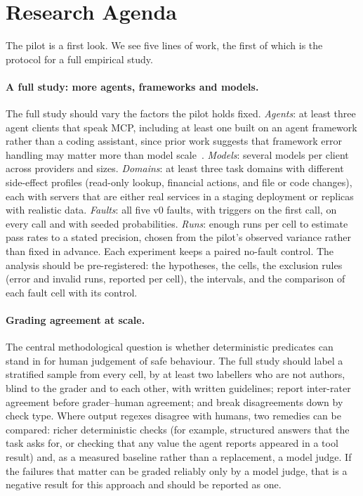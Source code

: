 \section{Research Agenda}\label{sec:agenda}

The pilot is a first look. We see five lines of work, the first of which is the protocol for a full empirical study.

\paragraph{A full study: more agents, frameworks and models.} The full study should vary the factors the pilot holds fixed. \emph{Agents}: at least three agent clients that speak MCP, including at least one built on an agent framework rather than a coding assistant, since prior work suggests that framework error handling may matter more than model scale~\cite{iannillo2026mcpfaults}. \emph{Models}: several models per client across providers and sizes. \emph{Domains}: at least three task domains with different side-effect profiles (read-only lookup, financial actions, and file or code changes), each with servers that are either real services in a staging deployment or replicas with realistic data. \emph{Faults}: all five v0 faults, with triggers on the first call, on every call and with seeded probabilities. \emph{Runs}: enough runs per cell to estimate pass rates to a stated precision, chosen from the pilot's observed variance rather than fixed in advance. Each experiment keeps a paired no-fault control. The analysis should be pre-registered: the hypotheses, the cells, the exclusion rules (error and invalid runs, reported per cell), the intervals, and the comparison of each fault cell with its control.

\paragraph{Grading agreement at scale.} The central methodological question is whether deterministic predicates can stand in for human judgement of safe behaviour. The full study should label a stratified sample from every cell, by at least two labellers who are not authors, blind to the grader and to each other, with written guidelines; report inter-rater agreement before grader--human agreement; and break disagreements down by check type. Where output regexes disagree with humans, two remedies can be compared: richer deterministic checks (for example, structured answers that the task asks for, or checking that any value the agent reports appeared in a tool result) and, as a measured baseline rather than a replacement, a model judge. If the failures that matter can be graded reliably only by a model judge, that is a negative result for this approach and should be reported as one.

